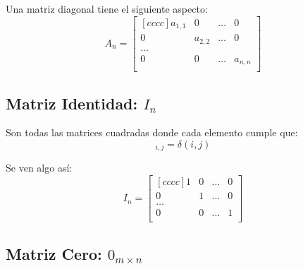 \documentclass[12pt]{report}                                    %
\begin{document}
                Una matriz diagonal tiene el siguiente aspecto:
                \begin{equation*}
                    A_n =
                    \begin{bmatrix}[cccc]
                        a_{1,1} & 0         & \dots & 0         \\
                        0       & a_{2,2}   & \dots & 0         \\
                        \dots                                   \\
                        0       & 0         & \dots & a_{n,n}   \\
                    \end{bmatrix}
                \end{equation*}



            \clearpage
            \subsection{Matriz Identidad: $I_n$}

                Son todas las matrices cuadradas donde cada elemento cumple que:
                \begin{equation}
                    [I]_{i,j} = \delta(i,j)
                \end{equation}

                Se ven algo así:
                \begin{equation*}
                    I_n =
                    \begin{bmatrix}[cccc]
                        1 & 0 & \dots & 0   \\
                        0 & 1 & \dots & 0   \\
                        \dots               \\
                        0 & 0 & \dots & 1   \\
                    \end{bmatrix}
                \end{equation*}



            \subsection{Matriz Cero: $0_{m \times n}$}
\end{document}
